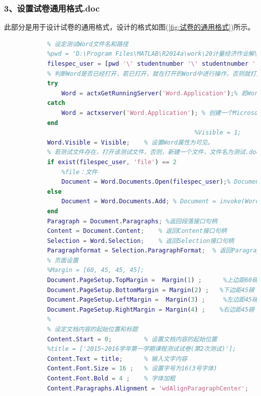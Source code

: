         \subsubsection{3、设置试卷通用格式.doc}
            此部分是用于设计试卷的通用格式，设计的格式如图(\ref{fig:试卷的通用格式})所示。
            \begin{lstlisting}[language=Matlab]
            %%%%%%%%%%%%%%%%%设置试卷通用格式.doc%%%%%%%%%%%%%%%%
            % 设定测试Word文件名和路径
            %pwd = 'D:\Program Files\MATLAB\R2014a\work\20计量经济作业解\生成的试卷';
            filespec_user = [pwd '\' studentnumber '\' studentnumber '.doc'];
            % 判断Word是否已经打开，若已打开，就在打开的Word中进行操作，否则就打开Word
            try
                Word = actxGetRunningServer('Word.Application');% 若Word服务器已经打开，返回其句柄Word
            catch
                Word = actxserver('Word.Application'); % 创建一个Microsoft Word服务器，返回句柄Word
            end
                                                     %Visible = 1;
            Word.Visible = Visible;    % 设置Word属性为可见。
            % 若测试文件存在，打开该测试文件，否则，新建一个文件，文件名为测试.doc
            if exist(filespec_user, 'file') == 2
                %file：文件
                Document = Word.Documents.Open(filespec_user);% Document = invoke(Word.Documents,'Open',filespec_user);
            else
                Document = Word.Documents.Add; % Document = invoke(Word.Documents, 'Add');
            end
            Paragraph = Document.Paragraphs; %返回段落接口句柄
            Content = Document.Content;    % 返回Content接口句柄
            Selection = Word.Selection;    % 返回Selection接口句柄
            Paragraphformat = Selection.ParagraphFormat;  % 返回ParagraphFormat接口句柄
            % 页面设置
            %Margin = [60, 45, 45, 45];
            Document.PageSetup.TopMargin =  Margin(1) ;      %上边距60磅
            Document.PageSetup.BottomMargin = Margin(2) ;   %下边距45磅
            Document.PageSetup.LeftMargin =  Margin(3) ;     %左边距45磅
            Document.PageSetup.RightMargin = Margin(4) ;    %右边距45磅
            %
            % 设定文档内容的起始位置和标题
            Content.Start = 0;         % 设置文档内容的起始位置
            %title = ['2015~2016学年第一学期课程测试试卷(第2次测试)'];
            Content.Text = title;      % 输入文字内容
            Content.Font.Size = 16 ;   % 设置字号为16(3号字体)
            Content.Font.Bold = 4 ;    % 字体加粗
            Content.Paragraphs.Alignment = 'wdAlignParagraphCenter';    % 居中对齐

\end{lstlisting}
